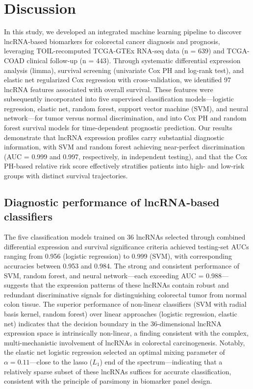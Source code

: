 \documentclass[fleqn,10pt]{wlscirep}
\begin{document}
\section*{Discussion}

In this study, we developed an integrated machine learning pipeline to discover lncRNA-based biomarkers for colorectal cancer diagnosis and prognosis, leveraging TOIL-recomputed TCGA-GTEx RNA-seq data (n = 639) and TCGA-COAD clinical follow-up (n = 443). Through systematic differential expression analysis (limma), survival screening (univariate Cox PH and log-rank test), and elastic net regularized Cox regression with cross-validation, we identified 97 lncRNA features associated with overall survival. These features were subsequently incorporated into five supervised classification models—logistic regression, elastic net, random forest, support vector machine (SVM), and neural network—for tumor versus normal discrimination, and into Cox PH and random forest survival models for time-dependent prognostic prediction. Our results demonstrate that lncRNA expression profiles carry substantial diagnostic information, with SVM and random forest achieving near-perfect discrimination (AUC = 0.999 and 0.997, respectively, in independent testing), and that the Cox PH-based relative risk score effectively stratifies patients into high- and low-risk groups with distinct survival trajectories.

\subsection*{Diagnostic performance of lncRNA-based classifiers}

The five classification models trained on 36 lncRNAs selected through combined differential expression and survival significance criteria achieved testing-set AUCs ranging from 0.956 (logistic regression) to 0.999 (SVM), with corresponding accuracies between 0.953 and 0.984. The strong and consistent performance of SVM, random forest, and neural network—each exceeding AUC = 0.988—suggests that the expression patterns of these lncRNAs contain robust and redundant discriminative signals for distinguishing colorectal tumor from normal colon tissue. The superior performance of non-linear classifiers (SVM with radial basis kernel, random forest) over linear approaches (logistic regression, elastic net) indicates that the decision boundary in the 36-dimensional lncRNA expression space is intrinsically non-linear, a finding consistent with the complex, multi-mechanistic involvement of lncRNAs in colorectal carcinogenesis\cite{RN4,RN5,RN6}. Notably, the elastic net logistic regression selected an optimal mixing parameter of $\alpha = 0.11$—close to the lasso ($L_1$) end of the spectrum—indicating that a relatively sparse subset of these lncRNAs suffices for accurate classification, consistent with the principle of parsimony in biomarker panel design.
\end{document}
